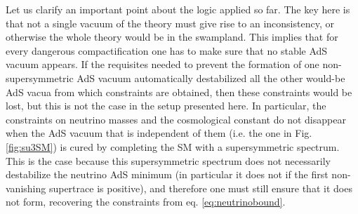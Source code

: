 \documentclass[11pt,a4paper]{article}
\begin{document}
Let us clarify an important point about the logic applied so far. The key here is that not a single vacuum of the theory must give rise to an inconsistency, or otherwise the whole theory would be in the swampland. This implies that for every dangerous compactification one has to make sure that no stable AdS vacuum appears. If the requisites needed to prevent the formation of one non-supersymmetric AdS vacuum automatically destabilized all the other would-be AdS vacua from which constraints are obtained, then these constraints would be lost, but this is not the case in the setup presented here. In particular, the constraints on neutrino masses and the cosmological constant do not disappear when the AdS vacuum that is independent of them (i.e. the one in Fig. \ref{fig:su3SM}) is cured by completing the SM with a supersymmetric spectrum. This is the case because this supersymmetric spectrum does not necessarily destabilize the neutrino AdS minimum (in particular it does not if the first non-vanishing supertrace is positive), and therefore one must still ensure that it does not form, recovering the constraints from eq. \eqref{eq:neutrinobound}.
\end{document}
